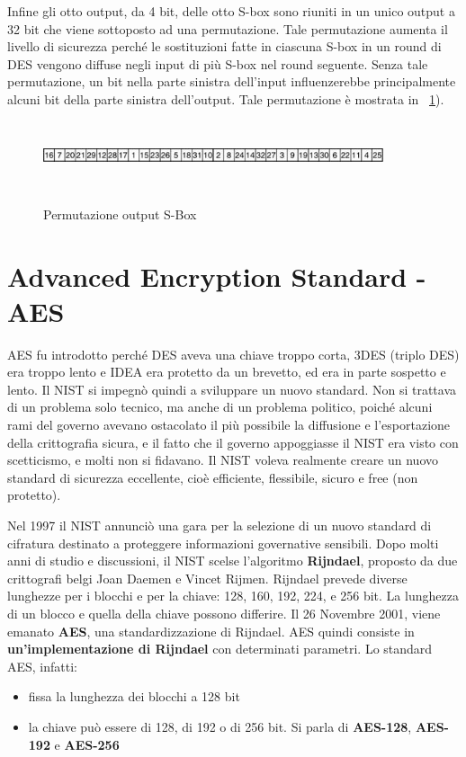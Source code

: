 Infine gli otto output, da 4 bit, delle otto S-box sono riuniti in un unico output a 32 bit che viene sottoposto ad una permutazione. Tale permutazione aumenta il livello di sicurezza perché le sostituzioni fatte in ciascuna S-box in un round di DES vengono diffuse negli input di più S-box nel round seguente. Senza tale permutazione, un bit nella parte sinistra dell'input influenzerebbe principalmente alcuni bit della parte sinistra dell'output. Tale permutazione è mostrata in \figurename ~\ref{fig:sbox_perm}).
\begin{figure}[htbp]
	\centering%
	\subfigure%
	{\includegraphics[height=2cm, width=10cm, keepaspectratio]{Immagini/chiave_segreta/sbox_perm.png}}
	\caption{Permutazione output S-Box \label{fig:sbox_perm}} 	
\end{figure}
	
\section{Advanced Encryption Standard - AES}
AES fu introdotto perché DES aveva una chiave troppo corta, 3DES (triplo DES) era troppo lento e IDEA era protetto da un brevetto, ed era in parte sospetto e lento. Il NIST si impegnò quindi a sviluppare un nuovo standard. Non si trattava di un problema solo tecnico, ma anche di un problema politico, poiché alcuni rami del governo avevano ostacolato il più possibile la diffusione e l'esportazione della crittografia sicura, e il fatto che il governo appoggiasse il NIST era visto con scetticismo, e molti non si fidavano. Il NIST voleva realmente creare un nuovo standard di sicurezza eccellente, cioè efficiente, flessibile, sicuro e free (non protetto). \newline

Nel 1997 il NIST annunciò una gara per la selezione di un nuovo standard di cifratura destinato a proteggere informazioni governative sensibili. Dopo molti anni di studio e discussioni, il NIST scelse l'algoritmo \textbf{Rijndael}, proposto da due crittografi belgi Joan Daemen e Vincet Rijmen. Rijndael prevede diverse lunghezze per i blocchi e
per la chiave: 128, 160, 192, 224, e 256 bit. La lunghezza di un blocco e quella della chiave possono differire. Il 26 Novembre 2001, viene emanato \textbf{AES}, una standardizzazione di Rijndael. AES quindi consiste in \textbf{un'implementazione di Rijndael} con determinati parametri. Lo standard AES, infatti:
\begin{itemize}
  \item fissa la lunghezza dei blocchi a 128 bit
  \item la chiave può essere di 128, di 192 o di 256 bit. Si parla di \textbf{AES-128}, \textbf{AES-192} e \textbf{AES-256}
\end{itemize}

